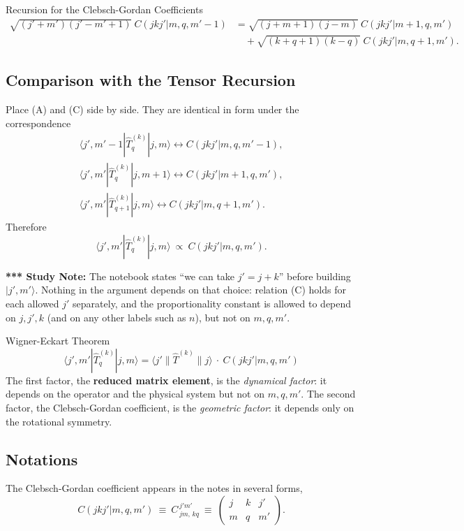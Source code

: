 \documentclass[11pt,a4paper]{article}
\begin{document}
\begin{thm}{Recursion for the Clebsch-Gordan Coefficients}
\begin{align*}
\sqrt{(j'+m')(j'-m'+1)}\ C(jkj'|m,q,m'-1)&=\sqrt{(j+m+1)(j-m)}\ C(jkj'|m+1,q,m')\\
&\quad+\sqrt{(k+q+1)(k-q)}\ C(jkj'|m,q+1,m').\tag{C}
\end{align*}
\end{thm}

\subsection{Comparison with the Tensor Recursion}
Place (A) and (C) side by side. They are identical in form under the correspondence
\begin{gather*}
\langle j',m'-1|\hat T^{(k)}_q|j,m\rangle\leftrightarrow C(jkj'|m,q,m'-1),\\
\langle j',m'|\hat T^{(k)}_q|j,m+1\rangle\leftrightarrow C(jkj'|m+1,q,m'),\\
\langle j',m'|\hat T^{(k)}_{q+1}|j,m\rangle\leftrightarrow C(jkj'|m,q+1,m').
\end{gather*}
Therefore
\[
\langle j',m'|\hat T^{(k)}_q|j,m\rangle\ \propto\ C(jkj'|m,q,m').
\]

\textbf{*** Study Note:} The notebook states ``we can take $j'=j+k$'' before building $|j',m'\rangle$. Nothing in the argument depends on that choice: relation (C) holds for each allowed $j'$ separately, and the proportionality constant is allowed to depend on $j,j',k$ (and on any other labels such as $n$), but not on $m,q,m'$.

\begin{thm}{Wigner-Eckart Theorem}
\[
\boxed{\ \langle j',m'|\hat T^{(k)}_q|j,m\rangle=\langle j'\|\hat T^{(k)}\|j\rangle\ \cdot\ C(jkj'|m,q,m')\ }
\]
The first factor, the \textbf{reduced matrix element}, is the \emph{dynamical factor}: it depends on the operator and the physical system but not on $m,q,m'$. The second factor, the Clebsch-Gordan coefficient, is the \emph{geometric factor}: it depends only on the rotational symmetry.
\end{thm}

\subsection{Notations}
The Clebsch-Gordan coefficient appears in the notes in several forms,
\[
C(jkj'|m,q,m')\ \equiv\ C^{\,j'm'}_{\,jm,\,kq}\ \equiv\ \begin{pmatrix}j&k&j'\\m&q&m'\end{pmatrix}.
\]
\end{document}
